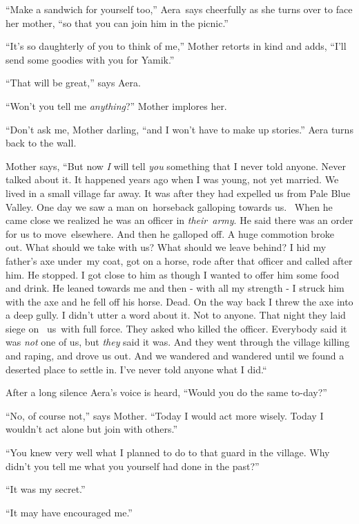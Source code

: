 \documentclass[twoside,11pt]{book}
\begin{document}
``Make a sandwich for yourself too,'' Aera\ says cheerfully as she turns over to face her
mother, ``so that you can join him in the picnic.'' 

``It's so daughterly of you to think of me,'' Mother retorts in kind and adds,
``I'll send some goodies with you for Yamik.''

``That will be great,'' says Aera.

``Won't you tell me \textit{anything}?'' Mother implores her. 

``Don't ask me, Mother darling, ``and I won't have to make up stories.'' Aera
turns back to the wall.\ 

Mother says, ``But now \textit{I }will tell \textit{you} something that I never told anyone. Never talked
about it. It happened years ago when I was young, not yet married. We lived in a small village far away. It was after
they had expelled us from Pale Blue Valley. One day we saw a man on~horseback galloping towards us. ~When he came close
we realized he was an officer in \textit{their}\ \textit{army}. He said there was an order for us to move~elsewhere.
And then he galloped off. A huge commotion broke out. What should we take with us? What should we leave behind? I hid
my father's axe under~my coat, got on a horse, rode after that officer and called after him. He stopped. I got close to
him as though I wanted to offer him some food and drink. He leaned towards me and then {}- with all my strength -  I
struck him with the axe and he fell off his horse. Dead. On the way back I threw the axe into a deep gully. I didn't
utter a word about it. Not to anyone. That night they laid siege on \ us\ with full force. They asked who killed the
officer. Everybody said it was \textit{not} one of us, but \textit{they} said it was. And they went through the village
killing and raping, and drove us out. And we wandered and wandered until we found a deserted place to settle in. I've
never told anyone what I did.``\ 

After a long silence Aera's voice is heard, ``Would you do the same to-day?'' 

``No, of course not,'' says Mother. ``Today I would act more wisely. Today I
wouldn't act alone but join with others.'' 

``You knew very well what I planned to do to that guard in the village. Why didn't you tell me what you
yourself had done in the past?'' 

``It was my secret.'' 

``It may have encouraged me.'' 
\end{document}
